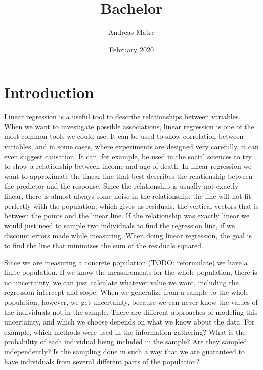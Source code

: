 \documentclass{article}
\title{Bachelor}
\author{Andreas Matre}
\date{February 2020}
\begin{document}
\newtheorem{definition}{Definition}[section]
\newtheorem{theorem}{Theorem}
\newtheorem{example}{Example}[section]


\maketitle

\begin{abstract}
\end{abstract}

\tableofcontents

\section{Introduction}

Linear regression is a useful tool to describe relationships between variables.
When we want to investigate possible associations, linear regression
is one of the most common tools we could use. It can be used to show correlation between
variables, and in some cases, where experiments are designed very carefully, it can even suggest causation.
It can, for example, be used in the social sciences to try to show a relationship
between income and age of death. In linear regression we want to approximate the
linear line that best describes the relationship between the predictor and the
response. Since the relationship is usually not exactly linear, there is almost
always some noise in the relationship, the line will not
fit perfectly with the population, which gives us residuals, the vertical
vectors that is between the points and the linear line. If the relationship was
exactly linear we would just need to sample two individuals to find the
regression line, if we discount errors made while measuring. When doing linear
regression, the goal is to find the line that minimizes the sum of the residuals squared.


Since we are measuring a concrete population
(TODO: reformulate) we
have a finite population. If we know the measurements for the whole population, there
is no uncertainty, we can just calculate whatever value we
want, including the regression intercept and slope. When we generalize from a sample to the whole population, however, we get
uncertainty, because we can never know the values of the individuals not in the sample. There are different approaches of modeling this uncertainty, and
which we choose depends on what we know about the data. For example, which
methods were used in the information gathering?
What is the probability of each
individual being included in the sample? Are they sampled independently? Is the
sampling done in such a way that we are guaranteed to have individuals from
several different parts of the population?
\end{document}
